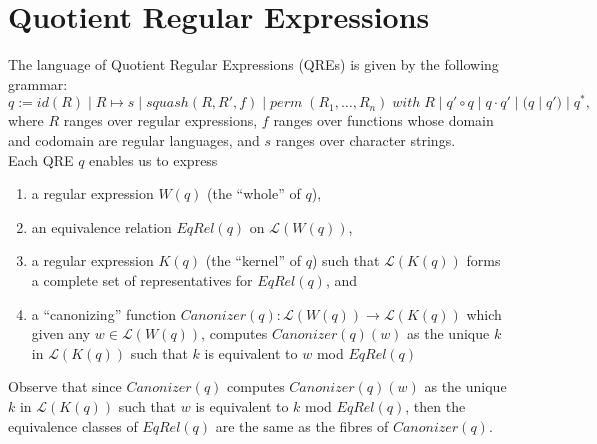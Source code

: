 \documentclass{svproc}
\begin{document}
\section{Quotient Regular Expressions}
The language of Quotient Regular Expressions (QREs) is given by the following
grammar:
$$q := id(R) \; | \; R \mapsto s \; | \; squash (R, R', f) \; | \; perm \;
(R_1, \ldots, R_n) \; with \; R \; | \; q' \circ q \; | \; q \cdot q' \; | \;
(q \; | \; q') \; | \; q^*,$$
where $R$ ranges over regular expressions, $f$ ranges over functions whose
domain and codomain are regular languages, and $s$ ranges over character
strings.\\
Each QRE $q$ enables us to express
\begin{enumerate}
  \item a regular expression $W(q)$ (the ``whole'' of $q$),
  \item an equivalence relation $EqRel(q)$ on $\mathcal{L}(W(q))$,
  \item a regular expression $K(q)$ (the ``kernel'' of $q$)
  such that $\mathcal{L}(K(q))$ forms a complete set of representatives for
  $EqRel(q)$, and
  \item a ``canonizing'' function $Canonizer(q):\mathcal{L}(W(q))
  \longrightarrow \mathcal{L}(K(q))$ which given any $w \in \mathcal{L}(W(q))$,
  computes $Canonizer(q)(w)$ as the unique $k$ in $\mathcal{L}(K(q))$ such that
  $k$ is equivalent to $w$ mod $EqRel(q)$
\end{enumerate}
Observe that since $Canonizer(q)$ computes
$Canonizer(q)(w)$ as the unique $k$ in $\mathcal{L}(K(q))$ such that $w$ is
equivalent to $k$ mod $EqRel(q)$, then the equivalence classes of $EqRel(q)$
are the same as the fibres of $Canonizer(q)$.
\end{document}
